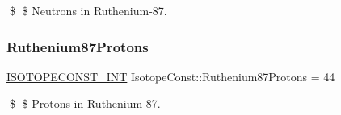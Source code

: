 \$ \$ Neutrons in Ruthenium-\/87. \mbox{\label{group___isotope_const-_ruthenium-_ru87_gab347314faee7a6a6e3c1c3dede76cc90}} 
\subsubsection{\texorpdfstring{Ruthenium87\+Protons}{Ruthenium87Protons}}
{\footnotesize\ttfamily \mbox{\hyperlink{group___isotope_const-_macros_ga5f18360b3e99483a35c32d789e62621c}{I\+S\+O\+T\+O\+P\+E\+C\+O\+N\+S\+T\+\_\+\+I\+NT}} Isotope\+Const\+::\+Ruthenium87\+Protons = 44}

\$ \$ Protons in Ruthenium-\/87. 